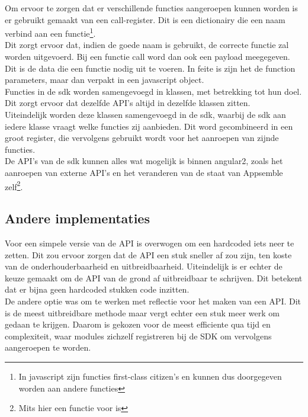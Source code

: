 Om ervoor te zorgen dat er verschillende functies aangeroepen kunnen worden is er gebruikt gemaakt van een call-register. Dit is een dictionairy die een naam verbind aan een functie\footnote{In javascript zijn functies first-class citizen's en kunnen dus doorgegeven worden aan andere functies}. \\

Dit zorgt ervoor dat, indien de goede naam is gebruikt, de correcte functie zal worden uitgevoerd. Bij een functie call word dan ook een payload meegegeven. Dit is de data die een functie nodig uit te voeren. In feite is zijn het de function parameters, maar dan verpakt in een javascript object. \\

Functies in de sdk worden samengevoegd in klassen, met betrekking tot hun doel. Dit zorgt ervoor dat dezelfde API's altijd in dezelfde klassen zitten. \\

Uiteindelijk worden deze klassen samengevoegd in de sdk, waarbij de sdk aan iedere klasse vraagt welke functies zij aanbieden. Dit word gecombineerd in een groot register, die vervolgens gebruikt wordt voor het aanroepen van zijnde functies. \\

De API's van de sdk kunnen alles wat mogelijk is binnen angular2, zoals het aanroepen van externe API's en het veranderen van de staat van Appsemble zelf\footnote{Mits hier een functie voor is}. \\

\subsection{Andere implementaties}

Voor een simpele versie van de API is overwogen om een hardcoded iets neer te zetten. Dit zou ervoor zorgen dat de API een stuk sneller af zou zijn, ten koste van de onderhouderbaarheid en uitbreidbaarheid. Uiteindelijk is er echter de keuze gemaakt om de API van de grond af uitbreidbaar te schrijven. Dit betekent dat er bijna geen hardcoded stukken code inzitten. \\

De andere optie was om te werken met reflectie voor het maken van een API. Dit is de meest uitbreidbare methode maar vergt echter een stuk meer werk om gedaan te krijgen. Daarom is gekozen voor de meest efficiente qua tijd en complexiteit, waar modules zichzelf registreren bij de SDK om vervolgens aangeroepen te worden.

